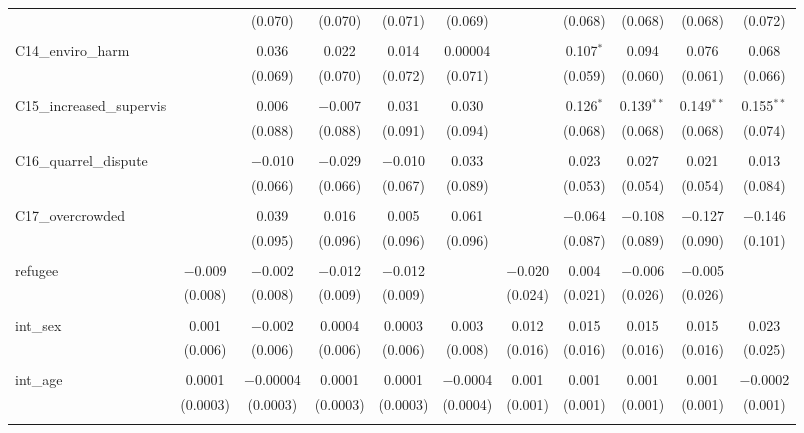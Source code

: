 \begin{table}[H]
\begin{tabular}{@{\extracolsep{4pt}}lcccccccccc}
  &  & (0.070) & (0.070) & (0.071) & (0.069) &  & (0.068) & (0.068) & (0.068) & (0.072) \\ 
  & & & & & & & & & & \\ 
 C14\_enviro\_harm &  & 0.036 & 0.022 & 0.014 & 0.00004 &  & 0.107$^{*}$ & 0.094 & 0.076 & 0.068 \\ 
  &  & (0.069) & (0.070) & (0.072) & (0.071) &  & (0.059) & (0.060) & (0.061) & (0.066) \\ 
  & & & & & & & & & & \\ 
 C15\_increased\_supervis &  & 0.006 & $-$0.007 & 0.031 & 0.030 &  & 0.126$^{*}$ & 0.139$^{**}$ & 0.149$^{**}$ & 0.155$^{**}$ \\ 
  &  & (0.088) & (0.088) & (0.091) & (0.094) &  & (0.068) & (0.068) & (0.068) & (0.074) \\ 
  & & & & & & & & & & \\ 
 C16\_quarrel\_dispute &  & $-$0.010 & $-$0.029 & $-$0.010 & 0.033 &  & 0.023 & 0.027 & 0.021 & 0.013 \\ 
  &  & (0.066) & (0.066) & (0.067) & (0.089) &  & (0.053) & (0.054) & (0.054) & (0.084) \\ 
  & & & & & & & & & & \\ 
 C17\_overcrowded &  & 0.039 & 0.016 & 0.005 & 0.061 &  & $-$0.064 & $-$0.108 & $-$0.127 & $-$0.146 \\ 
  &  & (0.095) & (0.096) & (0.096) & (0.096) &  & (0.087) & (0.089) & (0.090) & (0.101) \\ 
  & & & & & & & & & & \\ 
 refugee & $-$0.009 & $-$0.002 & $-$0.012 & $-$0.012 &  & $-$0.020 & 0.004 & $-$0.006 & $-$0.005 &  \\ 
  & (0.008) & (0.008) & (0.009) & (0.009) &  & (0.024) & (0.021) & (0.026) & (0.026) &  \\ 
  & & & & & & & & & & \\ 
 int\_sex & 0.001 & $-$0.002 & 0.0004 & 0.0003 & 0.003 & 0.012 & 0.015 & 0.015 & 0.015 & 0.023 \\ 
  & (0.006) & (0.006) & (0.006) & (0.006) & (0.008) & (0.016) & (0.016) & (0.016) & (0.016) & (0.025) \\ 
  & & & & & & & & & & \\ 
 int\_age & 0.0001 & $-$0.00004 & 0.0001 & 0.0001 & $-$0.0004 & 0.001 & 0.001 & 0.001 & 0.001 & $-$0.0002 \\ 
  & (0.0003) & (0.0003) & (0.0003) & (0.0003) & (0.0004) & (0.001) & (0.001) & (0.001) & (0.001) & (0.001) \\ 
  & & & & & & & & & & \\ 

\end{tabular}
\end{table}
